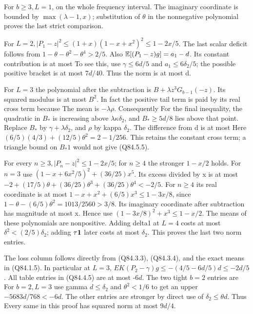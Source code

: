 For \(b\ge 3,\allowbreak  L=1\),
on the whole frequency interval. The imaginary coordinate is bounded
by \(\max(\lambda-1,\allowbreak  x)\); substitution of \(\theta\) in the nonnegative
polynomial proves the last strict comparison.

For \(L=2,\allowbreak  |P_1-z|^2\le(1+x)(1-x+x^2)^2\le1-2x/5\).
The last scalar deficit follows from
\(1-\theta-\theta^2-\theta^4>2/5\). Also
\(\mathbb E [(P_1-z)g]=a_1-d\). Its constant contribution is at most
To see this, use \(\gamma\le 6d/5\) and \(a_1\le 6\delta_2/5\); the possible positive
bracket is at most \(7d/40\). Thus the norm is at most d.

For \(L=3\) the polynomial after the subtraction is
\(B+\lambda z^3G_{b-1}(-z)\). Its squared modulus is at most \(B^2\).
In fact the positive tail term is paid by its real cross term because
The mean is \(-\lambda\rho\). Consequently
For the final inequality, the quadratic in \(B_*\) is increasing above
\(\lambda\kappa \delta_2\), and \(B_*\ge5d/8\) lies above that point.
Replace \(B_*\) by \(\gamma+\lambda \delta_2\), and \(\rho\) by kappa \(\delta_2\). The
difference from d is at most
Here \((6/5)(4/3)+(12/5)\theta^2=2-1/256\). This retains the constant
cross term; a triangle bound on \(B_*1\) would not give (Q84.5.5).

For every \(n\ge 3,\allowbreak  |P_n-z|^2\le1-2x/5\); for \(n\ge 4\) the stronger
\(1-x/2\) holds. For \(n=3\) use
\((1-x+6x^2/5)^2+(36/25)x^5\). Its excess divided by x is at most
\(-2+(17/5)\theta+(36/25)\theta^3+(36/25)\theta^4<-2/5\).
For \(n\ge 4\) its real coordinate is at most
\(1-x+x^2+(6/5)x^3\le1-3x/8\), since
\(1-\theta-(6/5)\theta^2=1013/2560>3/8\). Its imaginary
coordinate after subtraction has magnitude at most x. Hence use
\((1-3x/8)^2+x^3\le1-x/2\).
The means of these polynomials are nonpositive. Adding delta1
at \(L=4\) costs at most \(\delta^2<(2/5)\delta_2\); adding \(\tau\mathbf1\) later costs at most
\(\delta_2\). This proves the last two norm entries.

The loss column follows directly from (Q84.3.3), (Q84.3.4), and the exact means
in (Q84.1.5). In particular at \(L=3\),
\(E K(P_2-\gamma)g\le-(4/5-6d/5)d\le-2d/5\).
All table entries in (Q84.4.5) are at most -\(6d\). The two tight \(b=2\) entries are
For \(b=2,\allowbreak  L=3\) use gamma \(d\le \delta_2\) and \(\theta^2<1/6\) to get an upper
\(-5683d/768<-6d\). The other entries are stronger by direct use of
\(\delta_2\le\theta d\). Thus
Every same in this proof has squared norm at most \(9d/4\).

